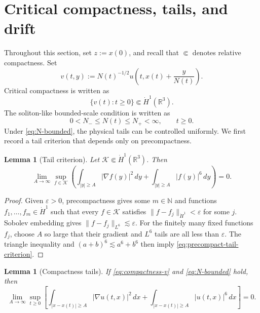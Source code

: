 \documentclass[10pt,a4paper]{amsart}
\numberwithin{equation}{section}
\newtheorem{lemma}[theorem]{Lemma}
\newcommand{\R}{\mathbb R}
\newcommand{\eps}{\varepsilon}
\begin{document}
\section{Critical compactness, tails, and drift}\label{sec:compactness}

Throughout this section, set $z:=x(0)$, and recall that $\Subset$ denotes relative compactness. Set
\begin{equation*}
  v(t,y):=N(t)^{-1/2}u\left(t,x(t)+\frac{y}{N(t)}\right).
\end{equation*}
Critical compactness is written as
\begin{equation}\label{eq:compactness-v}
  \{v(t):t\ge0\}\Subset\dot H^1(\R^3).
\end{equation}
The soliton-like bounded-scale condition is written as
\begin{equation}\label{eq:N-bounded}
  0<N_-\le N(t)\le N_+<\infty,
  \qquad t\ge0.
\end{equation}
Under \eqref{eq:N-bounded}, the physical tails can be controlled uniformly. We first record a tail criterion that depends only on precompactness.

\begin{lemma}[Tail criterion]\label{lem:precompact-tail-criterion}
Let $\mathcal K\Subset\dot H^1(\R^3)$. Then
\begin{equation}\label{eq:precompact-tail-criterion}
  \lim_{A\to\infty}\sup_{f\in\mathcal K}
  \left(
  \int_{|y|\ge A}|\nabla f(y)|^2\,dy
  +\int_{|y|\ge A}|f(y)|^6\,dy
  \right)=0.
\end{equation}
\end{lemma}

\begin{proof}
Given $\eps>0$, precompactness gives some $m\in\mathbb N$ and functions $f_1,\ldots,f_m\in\dot H^1$ such that every $f\in\mathcal K$ satisfies $\|f-f_j\|_{\dot H^1}<\eps$ for some $j$. Sobolev embedding gives $\|f-f_j\|_{L^6}\lesssim\eps$. For the finitely many fixed functions $f_j$, choose $A$ so large that their gradient and $L^6$ tails are all less than $\eps$. The triangle inequality and $(a+b)^6\lesssim a^6+b^6$ then imply \eqref{eq:precompact-tail-criterion}.
\end{proof}

\begin{lemma}[Compactness tails]\label{lem:compact-tail}
If \eqref{eq:compactness-v} and \eqref{eq:N-bounded} hold, then
\begin{equation}\label{eq:tail-limit}
  \lim_{A\to\infty}\sup_{t\ge0}
  \left[
  \int_{|x-x(t)|\ge A}|\nabla u(t,x)|^2\,dx
  +\int_{|x-x(t)|\ge A}|u(t,x)|^6\,dx
  \right]=0.
\end{equation}
\end{lemma}
\end{document}
